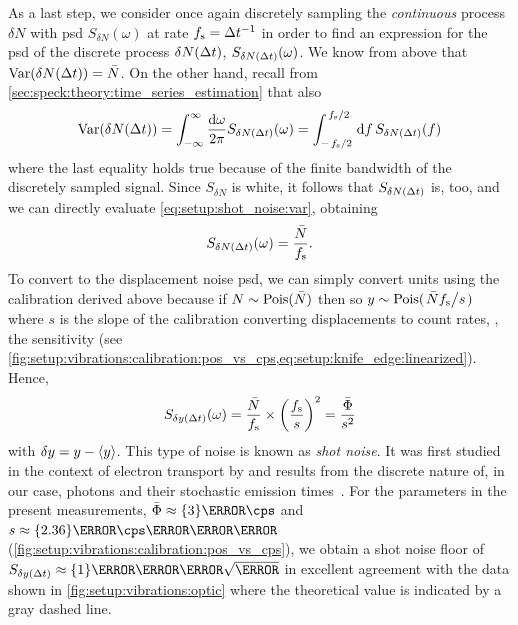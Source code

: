 As a last step, we consider once again discretely sampling the \emph{continuous} process $\delta N$ with \gls{psd} $S_{\delta N}(\omega)$ at rate $f_{\mathrm{s}}=\Delta t^{-1}$ in order to find an expression for the \gls{psd} of the discrete process $\delta N(\Delta t)$, $S_{\delta N(\Delta t)}(\omega)$.
We know from above that $\operatorname{Var}(\delta N(\Delta t)) = \bar{N}$.
On the other hand, recall from \cref{sec:speck:theory:time_series_estimation} that also
\begin{align}\label{eq:setup:shot_noise:var}
    \variance(\delta N(\dt)) = \intinf\ddf{\omega} S_{\delta N(\dt)}(\omega) = \int_{-\flatfrac{\fs}{2}}^{\flatfrac{\fs}{2}}\dd{f} S_{\delta N(\dt)}(f)
\end{align}
where the last equality holds true because of the finite bandwidth of the discretely sampled signal.
Since $S_{\delta N}$ is white, it follows that $S_{\delta N(\Delta t)}$ is, too, and we can directly evaluate \cref{eq:setup:shot_noise:var}, obtaining
\begin{equation}\label{eq:setup:shot_noise:psd}
    S_{\delta N(\Delta t)}(\omega) = \frac{\bar{N}}{f_{\mathrm{s}}}.
\end{equation}
To convert to the displacement noise \gls{psd}, we can simply convert units using the calibration derived above because if $N\sim\operatorname{Pois}(\bar{N})$ then so $y\sim\poisson(\flatfrac{\bar{N}\fs}{s})$ where $s$ is the slope of the calibration converting displacements to count rates, \ie, the sensitivity (see \cref{fig:setup:vibrations:calibration:pos_vs_cps,eq:setup:knife_edge:linearized}).
Hence,
\begin{equation}\label{eq:setup:shot_noise:noise_floor}
   S_{\delta y(\Delta t)}(\omega) = \frac{\bar{N}}{f_{\mathrm{s}}}\times\left(\frac{f_{\mathrm{s}}}{s}\right)^2 = \frac{\bar{\Phi}}{s^2}
\end{equation}
with $\delta y = y - \expval{y}$.
This type of noise is known as \emph{shot noise}.
It was first studied in the context of electron transport by \textcite{Schottky1918} and results from the discrete nature of, in our case, photons and their stochastic emission times~\cite{Blanter2000}.
For the parameters in the present measurements, $\bar{\Phi}\approx\qty{3}{\mega\cps}$ and $s\approx\qty{2.36}{\mega\cps\per\micro\meter}$ (\cf \cref{fig:setup:vibrations:calibration:pos_vs_cps}), we obtain a shot noise floor of $S_{\delta y(\dt)}\approx\qty{1}{\nano\meter\per\sqrt{\hertz}}$ in excellent agreement with the data shown in \cref{fig:setup:vibrations:optic} where the theoretical value is indicated by a gray dashed line.

